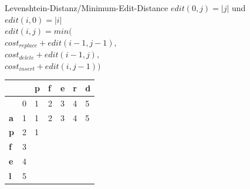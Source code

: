\documentclass[aspectratio=169]{beamer}
\begin{document}
\begin{frame}[fragile]{Levenshtein-Distanz/Minimum-Edit-Distance}
$edit(0,j)=|j|$ und $edit(i,0)=|i|$\\
$edit(i,j)=min($\\
$cost_{replace} + edit(i-1,j-1),  $\\
$cost_{delete}+ edit(i-1,j),$\\
$cost_{insert}+ edit(i,j-1))  $\\
\begin{table}[]
\begin{tabular}{|l|l|l|l|l|l|l|}
\hline
           & \textbf{} & \textbf{p} & \textbf{f} & \textbf{e} & \textbf{r} & \textbf{d} \\ \hline
\textbf{}  & 0         & 1          & 2          & 3          & 4          & 5          \\ \hline
\textbf{a} & 1         & 1          & 2          & 3          & 4          & 5          \\ \hline
\textbf{p} & 2         & 1          &            &            &            &            \\ \hline
\textbf{f} & 3         &            &            &            &            &            \\ \hline
\textbf{e} & 4         &            &            &            &            &            \\ \hline
\textbf{l} & 5         &            &            &            &            &            \\ \hline
\end{tabular}
\end{table}
\end{frame}
\end{document}
